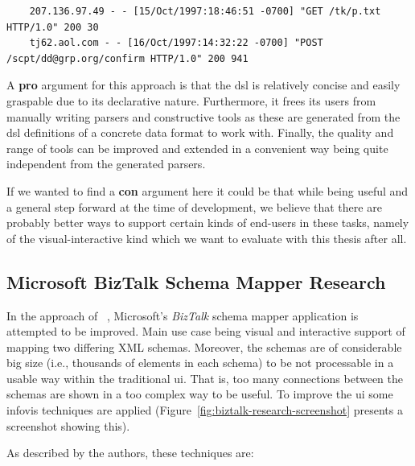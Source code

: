 {\tiny
  \begin{verbatim}
    207.136.97.49 - - [15/Oct/1997:18:46:51 -0700] "GET /tk/p.txt HTTP/1.0" 200 30
    tj62.aol.com - - [16/Oct/1997:14:32:22 -0700] "POST /scpt/dd@grp.org/confirm HTTP/1.0" 200 941
  \end{verbatim}
}

A \textbf{pro} argument for this approach is that the \gls{dsl} is relatively concise and easily graspable due to its declarative nature.
Furthermore, it frees its users from manually writing parsers and constructive tools as these are generated from the \gls{dsl} definitions of a concrete data format to work with.
Finally, the quality and range of tools can be improved and extended in a convenient way being quite independent from the generated parsers.

If we wanted to find a \textbf{con} argument here it could be that while being useful and a general step forward at the time of development, we believe that there are probably better ways to support certain kinds of end-users in these tasks, namely of the visual-interactive kind which we want to evaluate with this thesis after all.


\subsection{Microsoft BizTalk Schema Mapper Research}

In the approach of ~\cite{Robertson2005}, Microsoft's \emph{BizTalk} schema mapper application is attempted to be improved.
Main use case being visual and interactive support of mapping two differing \textsc{XML} schemas.
Moreover, the schemas are of considerable big size (i.e., thousands of elements in each schema) to be not processable in a usable way within the traditional \gls{ui}.
That is, too many connections between the schemas are shown in a too complex way to be useful.
To improve the \gls{ui} some \gls{infovis} techniques are applied (Figure~\ref{fig:biztalk-research-screenshot} presents a screenshot showing this).

As described by the authors, these techniques are:

